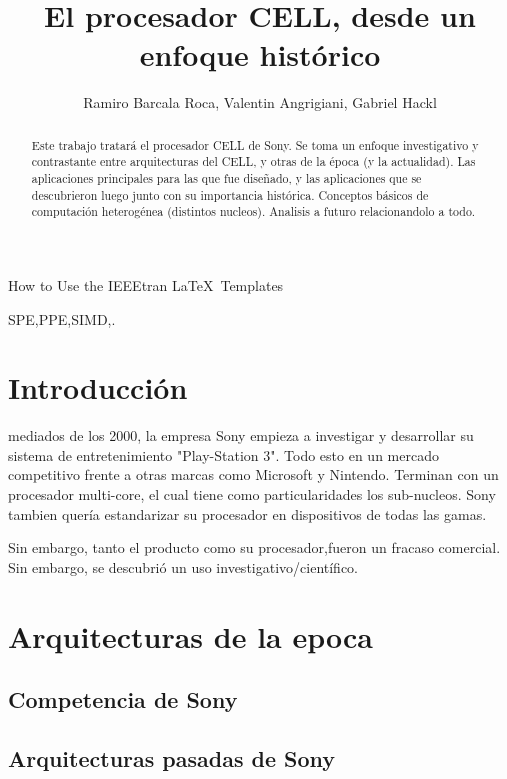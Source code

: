 \documentclass[11pt,compsoc]{IEEEtran}
\begin{document}
	\title{El procesador CELL, desde un enfoque
		histórico}
	\author{Ramiro Barcala Roca, Valentin Angrigiani, Gabriel Hackl}
		
	{How to Use the IEEEtran \LaTeX \ Templates}
	\maketitle
	
	\begin{abstract}
		Este trabajo tratará el procesador CELL de Sony. Se toma un enfoque investigativo y contrastante entre arquitecturas del CELL, y otras de la época (y la actualidad). Las aplicaciones principales para las que fue diseñado, y las aplicaciones que se descubrieron luego junto  con su importancia histórica. Conceptos básicos de computación heterogénea (distintos nucleos). Analisis a futuro relacionandolo a todo.
	\end{abstract}
	
	\begin{IEEEkeywords}
		SPE,PPE,SIMD,.
	\end{IEEEkeywords}
	
	\section{Introducción}
	 mediados de los 2000, la empresa Sony empieza a investigar y desarrollar su sistema de entretenimiento "Play-Station 3". Todo esto en un mercado competitivo frente a otras marcas como Microsoft y Nintendo. Terminan con un procesador multi-core, el cual tiene como particularidades los sub-nucleos. Sony tambien quería estandarizar su procesador en dispositivos de todas las gamas.
	
	Sin embargo, tanto el producto como su procesador,fueron un fracaso comercial. Sin embargo, se descubrió un uso investigativo/científico.
	
	
	\section{Arquitecturas de la epoca}
	\noindent 
	
	\subsection{Competencia de Sony}
	\noindent 
	
	\subsection{Arquitecturas pasadas de Sony}
	\noindent 
	
\end{document}
